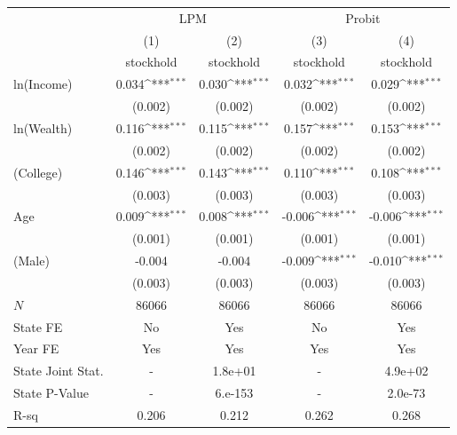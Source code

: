 {
\def\sym#1{\ifmmode^{#1}\else\(^{#1}\)\fi}
\begin{tabular*}{\textwidth}{l@{\extracolsep{\fill}}*{4}{c}}
\toprule
          &\multicolumn{2}{c}{LPM}              &\multicolumn{2}{c}{Probit}           \\
          &\multicolumn{1}{c}{(1)}&\multicolumn{1}{c}{(2)}&\multicolumn{1}{c}{(3)}&\multicolumn{1}{c}{(4)}\\
          &\multicolumn{1}{c}{stockhold}&\multicolumn{1}{c}{stockhold}&\multicolumn{1}{c}{stockhold}&\multicolumn{1}{c}{stockhold}\\
\midrule
ln(Income)&    0.034\sym{***}&    0.030\sym{***}&    0.032\sym{***}&    0.029\sym{***}\\
          &  (0.002)         &  (0.002)         &  (0.002)         &  (0.002)         \\
\addlinespace
ln(Wealth)&    0.116\sym{***}&    0.115\sym{***}&    0.157\sym{***}&    0.153\sym{***}\\
          &  (0.002)         &  (0.002)         &  (0.002)         &  (0.002)         \\
\addlinespace
1(College)&    0.146\sym{***}&    0.143\sym{***}&    0.110\sym{***}&    0.108\sym{***}\\
          &  (0.003)         &  (0.003)         &  (0.003)         &  (0.003)         \\
\addlinespace
Age       &    0.009\sym{***}&    0.008\sym{***}&   -0.006\sym{***}&   -0.006\sym{***}\\
          &  (0.001)         &  (0.001)         &  (0.001)         &  (0.001)         \\
\addlinespace
1(Male)   &   -0.004         &   -0.004         &   -0.009\sym{***}&   -0.010\sym{***}\\
          &  (0.003)         &  (0.003)         &  (0.003)         &  (0.003)         \\
\midrule
\(N\)     &    86066         &    86066         &    86066         &    86066         \\
State FE  &       No         &      Yes         &       No         &      Yes         \\
Year FE   &      Yes         &      Yes         &      Yes         &      Yes         \\
State Joint Stat.&        -         &  1.8e+01         &        -         &  4.9e+02         \\
State P-Value&        -         &  6.e-153         &        -         &  2.0e-73         \\
R-sq      &    0.206         &    0.212         &    0.262         &    0.268         \\
\bottomrule
\end{tabular*}
}
